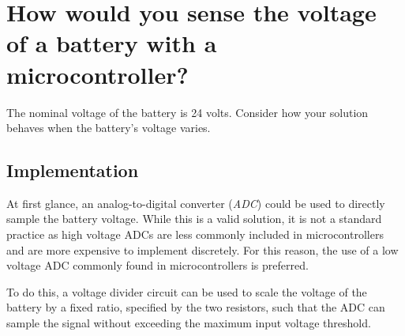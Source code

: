 \documentclass[main.tex]{subfiles}
\begin{document}
\section{How would you sense the voltage of a battery with a microcontroller?} \label{sec:voltage_divider} 
The nominal voltage of the battery is 24 volts. Consider how your solution behaves when the battery's voltage varies. 

\spoilerline

\subsection{Implementation}
\noindent At first glance, an analog-to-digital converter (\textit{ADC}) could be used to directly sample the battery voltage. While this is a valid solution, it is not a standard practice as high voltage ADCs are less commonly included in microcontrollers and are more expensive to implement discretely. For this reason, the use of a low voltage ADC commonly found in microcontrollers is preferred. \newline

\newnoindentpara To do this, a voltage divider circuit can be used to scale the voltage of the battery by a fixed ratio, specified by the two resistors, such that the ADC can sample the signal without exceeding the maximum input voltage threshold.
\end{document}
